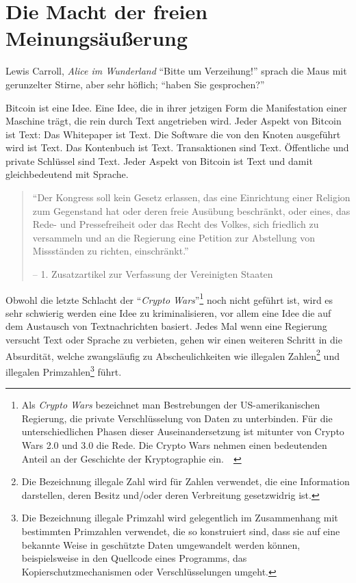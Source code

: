 \chapter{Die Macht der freien Meinungsäußerung}
\label{les:6}

\begin{chapquote}{Lewis Carroll, \textit{Alice im Wunderland}}
\enquote{Bitte um Verzeihung!} sprach die Maus mit gerunzelter Stirne,
aber sehr höflich; \enquote{haben Sie gesprochen?}
\end{chapquote}

Bitcoin ist eine Idee. Eine Idee, die in ihrer jetzigen Form die Manifestation
einer Maschine trägt, die rein durch Text angetrieben wird. Jeder Aspekt von
Bitcoin ist Text: Das Whitepaper ist Text. Die Software die von den Knoten
ausgeführt wird ist Text. Das Kontenbuch ist Text. Transaktionen sind Text.
Öffentliche und private Schlüssel sind Text. Jeder Aspekt von Bitcoin ist Text
und damit gleichbedeutend mit Sprache.

\begin{quotation}\begin{samepage}
\enquote{Der Kongress soll kein Gesetz erlassen, das eine Einrichtung einer
Religion zum Gegenstand hat oder deren freie Ausübung beschränkt, oder eines,
das Rede- und Pressefreiheit oder das Recht des Volkes, sich friedlich zu
versammeln und an die Regierung eine Petition zur Abstellung von Missständen zu
richten, einschränkt.}
\begin{flushright} -- 1. Zusatzartikel zur Verfassung der Vereinigten Staaten
\end{flushright}\end{samepage}\end{quotation}

Obwohl die letzte Schlacht der \enquote{\textit{Crypto Wars}}\footnote{Als \textit{Crypto
Wars} bezeichnet man Bestrebungen der US-amerikanischen Regierung, die private
Verschlüsselung von Daten zu unterbinden. Für die unterschiedlichen Phasen
dieser Auseinandersetzung ist mitunter von Crypto Wars 2.0 und 3.0 die Rede. Die
Crypto Wars nehmen einen bedeutenden Anteil an der Geschichte der Kryptographie
ein.~\cite{eff-cryptowars}~\cite{wiki:cryptowars}} noch nicht geführt ist, wird
es sehr schwierig werden eine Idee zu kriminalisieren, vor allem eine Idee die
auf dem Austausch von Textnachrichten basiert. Jedes Mal wenn eine Regierung
versucht Text oder Sprache zu verbieten, gehen wir einen weiteren Schritt in die
Absurdität, welche zwangsläufig zu Abscheulichkeiten wie illegalen
Zahlen\footnote{Die Bezeichnung illegale Zahl wird für Zahlen verwendet, die
eine Information darstellen, deren Besitz und/oder deren Verbreitung
gesetzwidrig ist.\cite{wiki:illegal-number}} und illegalen
Primzahlen\footnote{Die Bezeichnung illegale Primzahl wird gelegentlich im
Zusammenhang mit bestimmten Primzahlen verwendet, die so konstruiert sind, dass
sie auf eine bekannte Weise in geschützte Daten umgewandelt werden können,
beispielsweise in den Quellcode eines Programms, das Kopierschutzmechanismen
oder Verschlüsselungen umgeht.\cite{wiki:illegal-prime}} führt.

